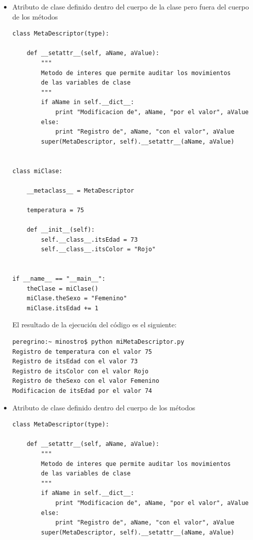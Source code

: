 \documentclass[12pt,legalpaper]{report}
\begin{document}
\begin{itemize}
	\item Atributo de clase definido dentro del cuerpo de la clase pero fuera del cuerpo de los métodos
	
\begin{singlespace}
\begin{lstlisting}[style=Python]
class MetaDescriptor(type):

    def __setattr__(self, aName, aValue):
        """
        Metodo de interes que permite auditar los movimientos
        de las variables de clase
        """    
        if aName in self.__dict__:
            print "Modificacion de", aName, "por el valor", aValue
        else:
            print "Registro de", aName, "con el valor", aValue
        super(MetaDescriptor, self).__setattr__(aName, aValue)
        
        
class miClase:
    
    __metaclass__ = MetaDescriptor
    
    temperatura = 75
    
    def __init__(self):
        self.__class__.itsEdad = 73
        self.__class__.itsColor = "Rojo"
    

if __name__ == "__main__":
    theClase = miClase()
    miClase.theSexo = "Femenino"
    miClase.itsEdad += 1
\end{lstlisting}

El resultado de la ejecución del código es el siguiente:

\begin{lstlisting}[style=consola,numbers=none]
peregrino:~ minostro$ python miMetaDescriptor.py
Registro de temperatura con el valor 75
Registro de itsEdad con el valor 73
Registro de itsColor con el valor Rojo
Registro de theSexo con el valor Femenino
Modificacion de itsEdad por el valor 74
\end{lstlisting}

\end{singlespace}
	
	
	\item Atributo de clase definido dentro del cuerpo de los métodos

\begin{singlespace}
\begin{lstlisting}[style=Python]
class MetaDescriptor(type):

    def __setattr__(self, aName, aValue):
        """
        Metodo de interes que permite auditar los movimientos
        de las variables de clase
        """    
        if aName in self.__dict__:
            print "Modificacion de", aName, "por el valor", aValue
        else:
            print "Registro de", aName, "con el valor", aValue
        super(MetaDescriptor, self).__setattr__(aName, aValue)
        

\end{lstlisting}
\end{singlespace}
\end{itemize}
\end{document}
